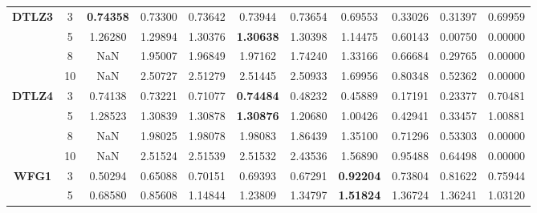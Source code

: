 \documentclass[conference]{IEEEtran}
\begin{document}
\begin{table*}[!htb]
\begin{tabular}{|c|c|c|c|c|c|c|c|c|c|c|}
		\multirow{4}{*}{\textbf{DTLZ3}} & 3          & \textbf{0.74358} & 0.73300           & 0.73642               & 0.73944          & 0.73654             & 0.69553             & 0.33026            & 0.31397              & 0.69959          \\ \cline{2-11} 
		& 5          & 1.26280          & 1.29894           & 1.30376               & \textbf{1.30638} & 1.30398             & 1.14475             & 0.60143            & 0.00750              & 0.00000          \\ \cline{2-11} 
		& 8          & NaN              & 1.95007           & 1.96849               & 1.97162          & 1.74240             & 1.33166             & 0.66684            & 0.29765              & 0.00000          \\ \cline{2-11} 
		& 10         & NaN              & 2.50727           & 2.51279               & 2.51445          & 2.50933             & 1.69956             & 0.80348            & 0.52362              & 0.00000          \\ \hline
		\multirow{4}{*}{\textbf{DTLZ4}} & 3          & 0.74138          & 0.73221           & 0.71077               & \textbf{0.74484} & 0.48232             & 0.45889             & 0.17191            & 0.23377              & 0.70481          \\ \cline{2-11} 
		& 5          & 1.28523          & 1.30839           & 1.30878               & \textbf{1.30876} & 1.20680             & 1.00426             & 0.42941            & 0.33457              & 1.00881          \\ \cline{2-11} 
		& 8          & NaN              & 1.98025           & 1.98078               & 1.98083          & 1.86439             & 1.35100             & 0.71296            & 0.53303              & 0.00000          \\ \cline{2-11} 
		& 10         & NaN              & 2.51524           & 2.51539               & 2.51532          & 2.43536             & 1.56890             & 0.95488            & 0.64498              & 0.00000          \\ \hline
		\multirow{4}{*}{\textbf{WFG1}}  & 3          & 0.50294          & 0.65088           & 0.70151               & 0.69393          & 0.67291             & \textbf{0.92204}    & 0.73804            & 0.81622              & 0.75944          \\ \cline{2-11} 
		& 5          & 0.68580          & 0.85608           & 1.14844               & 1.23809          & 1.34797             & \textbf{1.51824}    & 1.36724            & 1.36241              & 1.03120          \\ \cline{2-11} 

\end{tabular}
\end{table*}
\end{document}
